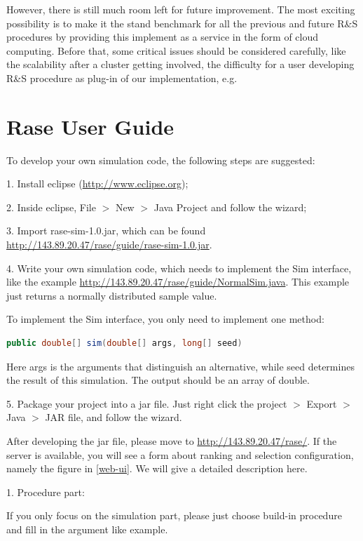 \documentclass[12pt,a4paper]{report}
\begin{document}
However, there is still much room left for future improvement. The most exciting possibility is to make it the stand benchmark for all the previous and future R\&S procedures by providing this implement as a service in the form of cloud computing. Before that, some critical issues should be considered carefully, like the scalability after a cluster getting involved, the difficulty for a user developing R\&S procedure as plug-in of our implementation, e.g.

\newpage
{}
\appendix

\chapter{Rase User Guide}

To develop your own simulation code, the following steps are suggested:

1.	Install eclipse (\url{http://www.eclipse.org});

2.	Inside eclipse, File $>$ New $>$ Java Project and follow the wizard;

3.	Import rase-sim-1.0.jar, which can be found \url{http://143.89.20.47/rase/guide/rase-sim-1.0.jar}.

4.	Write your own simulation code, which needs to implement the Sim interface, like the example \url{http://143.89.20.47/rase/guide/NormalSim.java}. This example just returns a normally distributed sample value.

To implement the Sim interface, you only need to implement one method:

\begin{lstlisting}[language=Java]
public double[] sim(double[] args, long[] seed)
\end{lstlisting}

Here args is the arguments that distinguish an alternative, while seed determines the result of this simulation. The output should be an array of double.

5.	Package your project into a jar file. Just right click the project $>$ Export $>$ Java $>$ JAR file, and follow the wizard.

After developing the jar file, please move to \url{http://143.89.20.47/rase/}. If the server is available, you will see a form about ranking and selection configuration, namely the figure in \ref{web-ui}. We will give a detailed description here.

1.	Procedure part:

If you only focus on the simulation part, please just choose build-in procedure and fill in the argument like example.
\end{document}
